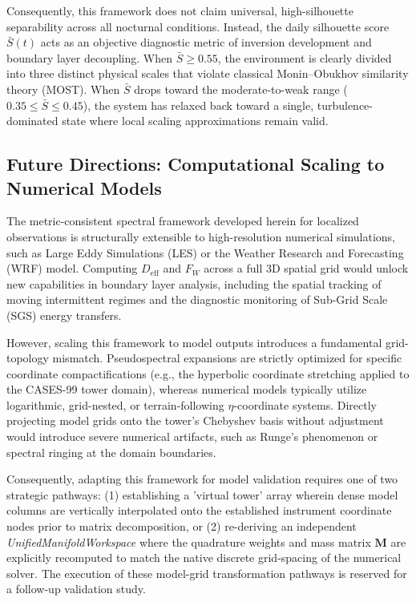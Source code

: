 Consequently, this framework does not claim universal, high-silhouette separability across all nocturnal conditions. Instead, the daily silhouette score $\bar{S}(t)$ acts as an objective diagnostic metric of inversion development and boundary layer decoupling. When $\bar{S} \ge 0.55$, the environment is clearly divided into three distinct physical scales that violate classical Monin--Obukhov similarity theory (MOST). When $\bar{S}$ drops toward the moderate-to-weak range ($0.35 \le \bar{S} \le 0.45$), the system has relaxed back toward a single, turbulence-dominated state where local scaling approximations remain valid.

\subsection{Future Directions: Computational Scaling to Numerical Models}
\label{sec:future:models}

The metric-consistent spectral framework developed herein for localized observations is structurally extensible to high-resolution numerical simulations, such as Large Eddy Simulations (LES) or the Weather Research and Forecasting (WRF) model. Computing $D_{\mathrm{eff}}$ and $F_W$ across a full 3D spatial grid would unlock new capabilities in boundary layer analysis, including the spatial tracking of moving intermittent regimes and the diagnostic monitoring of Sub-Grid Scale (SGS) energy transfers.

However, scaling this framework to model outputs introduces a fundamental grid-topology mismatch. Pseudospectral expansions are strictly optimized for specific coordinate compactifications (e.g., the hyperbolic coordinate stretching applied to the CASES-99 tower domain), whereas numerical models typically utilize logarithmic, grid-nested, or terrain-following $\eta$-coordinate systems. Directly projecting model grids onto the tower's Chebyshev basis without adjustment would introduce severe numerical artifacts, such as Runge's phenomenon or spectral ringing at the domain boundaries.

Consequently, adapting this framework for model validation requires one of two strategic pathways: (1) establishing a 'virtual tower' array wherein dense model columns are vertically interpolated onto the established instrument coordinate nodes prior to matrix decomposition, or (2) re-deriving an independent \emph{UnifiedManifoldWorkspace} where the quadrature weights and mass matrix $\mathbf{M}$ are explicitly recomputed to match the native discrete grid-spacing of the numerical solver. The execution of these model-grid transformation pathways is reserved for a follow-up validation study.


